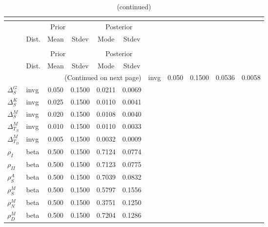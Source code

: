  
\begin{center}
\begin{longtable}{llcccc} 
\caption{Results from posterior maximization (parameters)}\\
 \label{Table:Posterior:1}\\
\toprule 
  & \multicolumn{3}{c}{Prior}  &  \multicolumn{2}{c}{Posterior} \\
  \cmidrule(r{.75em}){2-4} \cmidrule(r{.75em}){5-6}
  & Dist. & Mean  & Stdev & Mode & Stdev \\ 
\midrule \endfirsthead 
\caption{(continued)}\\
 \bottomrule 
  & \multicolumn{3}{c}{Prior}  &  \multicolumn{2}{c}{Posterior} \\
  \cmidrule(r{.75em}){2-4} \cmidrule(r{.75em}){5-6}
  & Dist. & Mean  & Stdev & Mode & Stdev \\ 
\midrule \endhead 
\bottomrule \multicolumn{6}{r}{(Continued on next page)}\endfoot 
\bottomrule\endlastfoot 
${\Delta^{A}_{S}}$ & invg &   0.050 & 0.1500 &   0.0536 &  0.0058 \\ 
${\Delta^{G}_{S}}$ & invg &   0.050 & 0.1500 &   0.0211 &  0.0069 \\ 
${\Delta^{K}_{S}}$ & invg &   0.025 & 0.1500 &   0.0110 &  0.0041 \\ 
${\Delta^{M}_{S}}$ & invg &   0.020 & 0.1500 &   0.0108 &  0.0040 \\ 
${\Delta^{M}_{T_N}}$ & invg &   0.010 & 0.1500 &   0.0110 &  0.0033 \\ 
${\Delta^{M}_{T_D}}$ & invg &   0.005 & 0.1500 &   0.0032 &  0.0009 \\ 
${\rho_{I}}$ & beta &   0.500 & 0.1500 &   0.7124 &  0.0774 \\ 
${\rho_{II}}$ & beta &   0.500 & 0.1500 &   0.7123 &  0.0775 \\ 
${\rho^{A}_{S}}$ & beta &   0.500 & 0.1500 &   0.7039 &  0.0832 \\ 
${\rho^{M}_{S}}$ & beta &   0.500 & 0.1500 &   0.5797 &  0.1556 \\ 
${\rho^{M}_{N}}$ & beta &   0.500 & 0.1500 &   0.3751 &  0.1250 \\ 
${\rho^{M}_{D}}$ & beta &   0.500 & 0.1500 &   0.7204 &  0.1286 \\ 
\end{longtable}
 \end{center}
